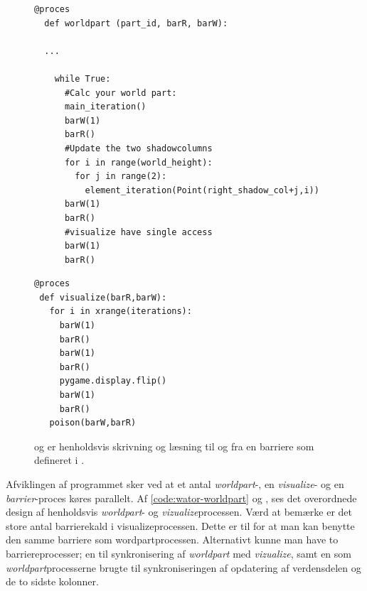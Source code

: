 \begin{figure}[hbtp]
\begin{minipage}{\linewidth}
\begin{lstlisting}[label=code:wator-worldpart,caption=Uddrag af processen 
  \code{worldpart} i Wator]
  @proces
  def worldpart (part_id, barR, barW):
  
  ...
  
    while True:
      #Calc your world part:
      main_iteration()
      barW(1)
      barR()
      #Update the two shadowcolumns
      for i in range(world_height):
        for j in range(2):
          element_iteration(Point(right_shadow_col+j,i))
      barW(1)
      barR()
      #visualize have single access
      barW(1)
      barR()
\end{lstlisting}

\begin{lstlisting}[label=code:wator-visualize,caption=Processen 
  \emph{visualize} i Wator]
@proces
 def visualize(barR,barW):
   for i in xrange(iterations):
     barW(1)
     barR()
     barW(1)
     barR()
     pygame.display.flip()
     barW(1)
     barR()
   poison(barW,barR)
\end{lstlisting}

\end{minipage}
\caption[test]{ og  er henholdsvis skrivning og læsning til og 
fra en barriere som defineret i .}
\end{figure}
Afviklingen af programmet sker ved at et antal \emph{worldpart}-, en 
\emph{visualize}- og en \emph{barrier}-proces køres parallelt. Af 
\autoref{code:wator-worldpart} og \pageref{code:wator-visualize}, ses det 
overordnede design af henholdsvis \emph{worldpart}- og 
\emph{vizualize}processen.  Værd at bemærke er det store antal barrierekald i 
visualizeprocessen. Dette er til for at man kan benytte den samme barriere som 
wordpartprocessen. Alternativt kunne man have to barriereprocesser; en til 
synkronisering af \emph{worldpart} med \emph{vizualize}, samt en som 
\emph{worldpart}processerne brugte til synkroniseringen af opdatering af 
verdensdelen og de to sidste kolonner. 



